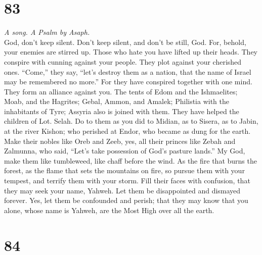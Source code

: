 \hypertarget{section-82}{%
\section{83}\label{section-82}}

\emph{A song. A Psalm by Asaph.}\\
 God, don't keep silent. Don't keep silent, and don't be
still, God.  For, behold, your enemies are stirred up.
Those who hate you have lifted up their heads.  They
conspire with cunning against your people. They plot against your
cherished ones.  ``Come,'' they say, ``let's destroy them
as a nation, that the name of Israel may be remembered no more.''
 For they have conspired together with one mind. They form
an alliance against you.  The tents of Edom and the
Ishmaelites; Moab, and the Hagrites;  Gebal, Ammon, and
Amalek; Philistia with the inhabitants of Tyre;  Assyria
also is joined with them. They have helped the children of Lot. Selah.
 Do to them as you did to Midian, as to Sisera, as to
Jabin, at the river Kishon;  who perished at Endor, who
became as dung for the earth.  Make their nobles like
Oreb and Zeeb, yes, all their princes like Zebah and Zalmunna,
 who said, ``Let's take possession of God's pasture
lands.''  My God, make them like tumbleweed, like chaff
before the wind.  As the fire that burns the forest, as
the flame that sets the mountains on fire,  so pursue
them with your tempest, and terrify them with your storm.
 Fill their faces with confusion, that they may seek your
name, Yahweh.  Let them be disappointed and dismayed
forever. Yes, let them be confounded and perish;  that
they may know that you alone, whose name is Yahweh, are the Most High
over all the earth.

\hypertarget{section-83}{%
\section{84}\label{section-83}}

